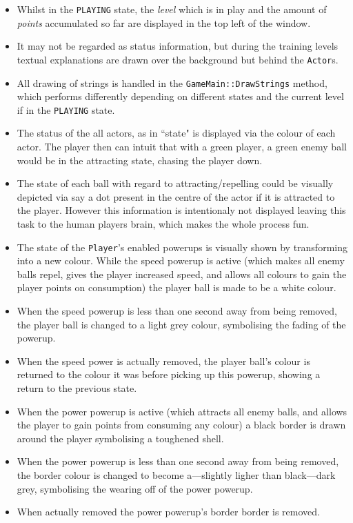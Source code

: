 \begin{itemize}
	\item Whilst in the \verb!PLAYING! state, the \emph{level} which is in play and the amount of \emph{points} accumulated so far are displayed in the top left of the window.
	\item It may not be regarded as status information, but during the training levels textual explanations are drawn over the background but behind the \verb!Actor!s.
	\item All drawing of strings is handled in the \verb!GameMain::DrawStrings! method, which performs differently depending on different states and the current level if in the \verb!PLAYING! state.
	\item The status of the all actors, as in ``state" is displayed via the colour of each actor. The player then can intuit that with a green player, a green enemy ball would be in the attracting state, chasing the player down.
	\item The state of each ball with regard to attracting/repelling could be visually depicted via say a dot present in the centre of the actor if it is attracted to the player. However this information is intentionaly not displayed leaving this task to the human players brain, which makes the whole process fun.
	\item The state of the \verb!Player!'s enabled powerups is visually shown by transforming into a new colour. While the speed powerup is active (which makes all enemy balls repel, gives the player increased speed, and allows all colours to gain the player points on consumption) the player ball is made to be a white colour.
	\item When the speed powerup is less than one second away from being removed, the player ball is changed to a light grey colour, symbolising the fading of the powerup.
	\item When the speed power is actually removed, the player ball's colour is returned to the colour it was before picking up this powerup, showing a return to the previous state.
	\item When the power powerup is active (which attracts all enemy balls, and allows the player to gain points from consuming any colour) a black border is drawn around the player symbolising a toughened shell.
	\item When the power powerup is less than one second away from being removed, the border colour is changed to become a---slightly ligher than black---dark grey, symbolising the wearing off of the power powerup.
	\item When actually removed the power powerup's border border is removed.
\end{itemize}

